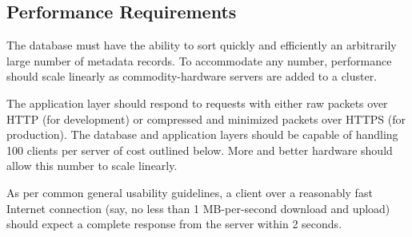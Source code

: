 \documentclass{abrice}
\begin{document}


\subsection{Performance Requirements}

The database must have the ability to sort quickly and efficiently an
arbitrarily large number of metadata records. To accommodate any number,
performance should scale linearly as commodity-hardware servers are added to a
cluster.

The application layer should respond to requests with either raw packets over
HTTP (for development) or compressed and minimized packets over HTTPS (for
production). The database and application layers should be capable of handling
100 clients per server of cost outlined below. More and better hardware should
allow this number to scale linearly.

As per common general usability guidelines, a client over a reasonably fast
Internet connection (say, no less than 1 MB-per-second download and upload)
should expect a complete response from the server within 2 seconds.
\end{document}
